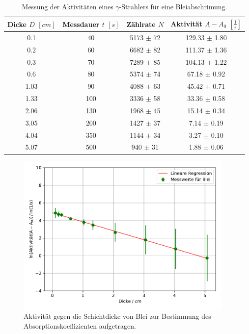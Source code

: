 \begin{table}[H]
  \begin{center}
    \caption{Messung der Aktivitäten eines $\gamma$-Strahlers für eine Bleiabschrimung.}
    \label{tab:Blei}
    \begin{tabular}{c|c|c|c} 
      \textbf{Dicke $D$ $[cm]$} & \textbf{Messdauer $t$ $[s]$} & \textbf{Zählrate $N$} & \textbf{Aktivität $A - A_0$ $[\frac{1}{s}]$}\\
      \hline
        0.1 & 40 & 5173 $\pm$ 72 & 129.33 $\pm$ 1.80 \\
        0.2 & 60 & 6682 $\pm$ 82 & 111.37 $\pm$ 1.36 \\
        0.3 & 70 & 7289 $\pm$ 85 & 104.13 $\pm$ 1.22 \\
        0.6 & 80 & 5374 $\pm$ 74 & 67.18 $\pm$ 0.92 \\
        1.03 & 90 & 4088 $\pm$ 63 & 45.42 $\pm$ 0.71 \\
        1.33 & 100 & 3336 $\pm$ 58 & 33.36 $\pm$ 0.58 \\
        2.06 & 130 & 1968 $\pm$ 45 & 15.14 $\pm$ 0.34 \\
        3.05 & 200 & 1427 $\pm$ 37 & 7.14 $\pm$ 0.19 \\
        4.04 & 350 & 1144 $\pm$ 34 & 3.27 $\pm$ 0.10 \\
        5.07 & 500 & 940 $\pm$ 31 & 1.88 $\pm$ 0.06
    \end{tabular}
  \end{center}
\end{table}

\begin{figure}[h]
  \centering
  \includegraphics[height=8cm]{Auswertung/Blei.pdf}
  \caption{Aktivität gegen die Schichtdicke von Blei zur Bestimmung des Absorptionskoeffizienten aufgetragen.}
  \label{fig:blei}
\end{figure}

